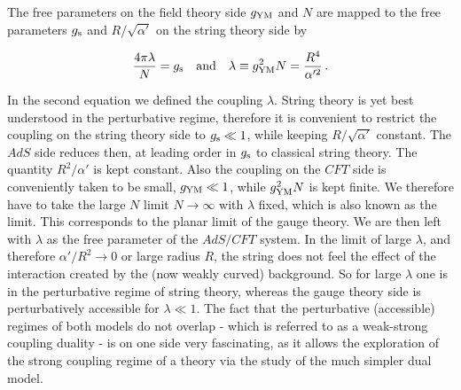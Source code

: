 %
%
\noindent The free parameters on the field theory side $g_{\rm YM}$ and $N$ are mapped to the free parameters $g_{\rm s}$ and $R/\sqrt{\alpha'}$ on the string theory side by
%
%
\begin{tcolorbox}[colback=white!95!black, colframe=white!90!black]
\begin{equation}
\frac{4\pi \lambda}{N} =  g_{\rm s} \quad {\rm and} \quad \lambda \equiv g_{\rm YM}^{2}N = \frac{R^{4}}{\alpha'^{2}}\,.
\label{eq: adscft_map}
\end{equation}
\end{tcolorbox}
%
%
In the second equation we defined the  coupling $\lambda$. String theory is yet best understood in the perturbative regime, therefore it is convenient to restrict the coupling on the string theory side to $g_{\rm s}\ll 1$, while keeping $R/\sqrt{\alpha'}$ constant. The $AdS$ side reduces then, at leading order in $g_{\rm s}$ to classical string theory. The quantity $R^{2}/\alpha'$ is kept constant.  Also the coupling on the $CFT$ side is conveniently taken to be small, $g_{\rm YM} \ll 1$, while $g_{\rm YM}^{2}N$ is kept finite. We therefore have to take the large $N$ limit $N \to \infty$ with $\lambda$ fixed, which is also known as the  limit. This corresponds to the planar limit of the gauge theory. We are then left with $\lambda$ as the free parameter of the $AdS/CFT$ system. In the limit of large $\lambda$, and therefore $\alpha'/R^{2}\to 0$ or large radius $R$, the string does not feel the effect of the interaction created by the (now weakly curved) background. So for large $\lambda$ one is in the perturbative regime of string theory, whereas the gauge theory side is perturbatively accessible for $\lambda \ll 1$.
%
%
The fact that the perturbative (accessible) regimes of both models do not overlap - which is referred to as a weak-strong coupling duality - is on one side very fascinating, as it allows the exploration of the strong coupling regime of a theory via the study of the much simpler dual model.

